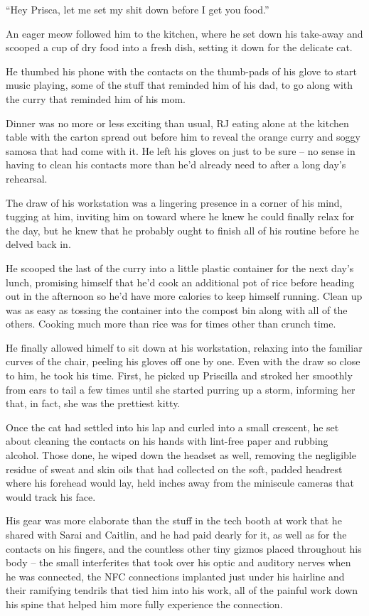 ``Hey Prisca, let me set my shit down before I get you food.''

An eager meow followed him to the kitchen, where he set down his take-away and scooped a cup of dry food into a fresh dish, setting it down for the delicate cat.

He thumbed his phone with the contacts on the thumb-pads of his glove to start music playing, some of the stuff that reminded him of his dad, to go along with the curry that reminded him of his mom.

Dinner was no more or less exciting than usual, RJ eating alone at the kitchen table with the carton spread out before him to reveal the orange curry and soggy samosa that had come with it.  He left his gloves on just to be sure -- no sense in having to clean his contacts more than he'd already need to after a long day's rehearsal.

The draw of his workstation was a lingering presence in a corner of his mind, tugging at him, inviting him on toward where he knew he could finally relax for the day, but he knew that he probably ought to finish all of his routine before he delved back in.

He scooped the last of the curry into a little plastic container for the next day's lunch, promising himself that he'd cook an additional pot of rice before heading out in the afternoon so he'd have more calories to keep himself running. Clean up was as easy as tossing the container into the compost bin along with all of the others.  Cooking much more than rice was for times other than crunch time.

He finally allowed himelf to sit down at his workstation, relaxing into the familiar curves of the chair, peeling his gloves off one by one.  Even with the draw so close to him, he took his time.  First, he picked up Priscilla and stroked her smoothly from ears to tail a few times until she started purring up a storm, informing her that, in fact, she was the prettiest kitty.

Once the cat had settled into his lap and curled into a small crescent, he set about cleaning the contacts on his hands with lint-free paper and rubbing alcohol.  Those done, he wiped down the headset as well, removing the negligible residue of sweat and skin oils that had collected on the soft, padded headrest where his forehead would lay, held inches away from the miniscule cameras that would track his face.

His gear was more elaborate than the stuff in the tech booth at work that he shared with Sarai and Caitlin, and he had paid dearly for it, as well as for the contacts on his fingers, and the countless other tiny gizmos placed throughout his body -- the small interferites that took over his optic and auditory nerves when he was connected, the NFC connections implanted just under his hairline and their ramifying tendrils that tied him into his work, all of the painful work down his spine that helped him more fully experience the connection.

